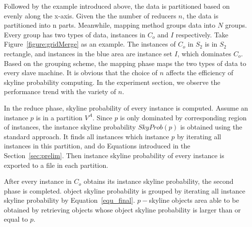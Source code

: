 Followed by the example introduced above, the data is partitioned based on evenly along the x-axis. Given the the number of reducers $n$, the data is partitioned into n parts. Meanwhile, mapping method groups data into $N$ groups. Every group has two types of data, instances in $C_o$ and $I$ respectively. Take Figure~\ref{figure:gridMerge} as an example. The instances of $C_o$ in $S_2$ is in $S_2$ rectangle, and instances in the blue area are instance set $I$, which dominates $C_o$. Based on the grouping scheme, the mapping phase maps the two types of data to every slave machine. It is obvious that the choice of $n$ affects the efficiency of skyline probability computing. In the experiment section, we observe the performance trend with the variety of $n$.

In the reduce phase, skyline probability of every instance is computed. Assume an instance $p$ is in a partition $V^A$. Since $p$ is only dominated by corresponding region of instances, the instance skyline probability $SkyProb(p)$ is obtained using the standard approach. It finds all instances which instance $p$ by iterating all instances in this partition, and do Equations introduced in the Section~\ref{sec:prelim}. Then instance skyline probability of every instance is exported to a file in each partition.

After every instance in $C_o$ obtains its instance skyline probability, the second phase is completed. object skyline probability is grouped by iterating all instance skyline probability by Equation~\ref{equ_final}. $p-$skyline objects area able to be obtained by retrieving objects whose object skyline probability is larger than or equal to $p$.

